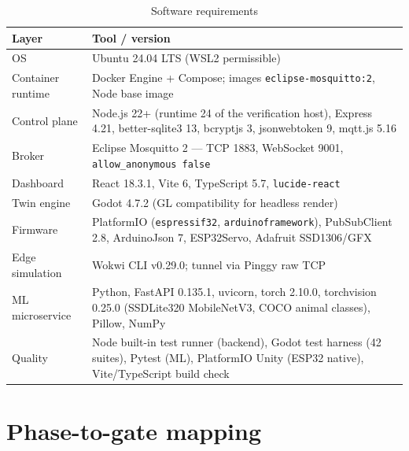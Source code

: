 \begin{longtable}{>{\raggedright}p{4.5cm} >{\raggedright\arraybackslash}p{9.0cm}}
\caption{Software requirements}\label{tab:software}\\
\toprule
\textbf{Layer} & \textbf{Tool / version} \\
\midrule
OS & Ubuntu 24.04 LTS (WSL2 permissible) \\
Container runtime & Docker Engine + Compose; images \texttt{eclipse-mosquitto:2}, Node base image \\
Control plane & Node.js 22+ (runtime 24 of the verification host), Express 4.21, better-sqlite3 13, bcryptjs 3, jsonwebtoken 9, mqtt.js 5.16 \\
Broker & Eclipse Mosquitto 2 --- TCP 1883, WebSocket 9001, \texttt{allow\_anonymous false} \\
Dashboard & React 18.3.1, Vite 6, TypeScript 5.7, \texttt{lucide-react} \\
Twin engine & Godot 4.7.2 (GL compatibility for headless render) \\
Firmware & PlatformIO (\texttt{espressif32}, \texttt{arduinoframework}), PubSubClient 2.8, ArduinoJson 7, ESP32Servo, Adafruit SSD1306/GFX \\
Edge simulation & Wokwi CLI v0.29.0; tunnel via Pinggy raw TCP \\
ML microservice & Python, FastAPI 0.135.1, uvicorn, torch 2.10.0, torchvision 0.25.0 (SSDLite320 MobileNetV3, COCO animal classes), Pillow, NumPy \\
Quality & Node built-in test runner (backend), Godot test harness (42 suites), Pytest (ML), PlatformIO Unity (ESP32 native), Vite/TypeScript build check \\
\bottomrule
\end{longtable}

\section{Phase-to-gate mapping}

